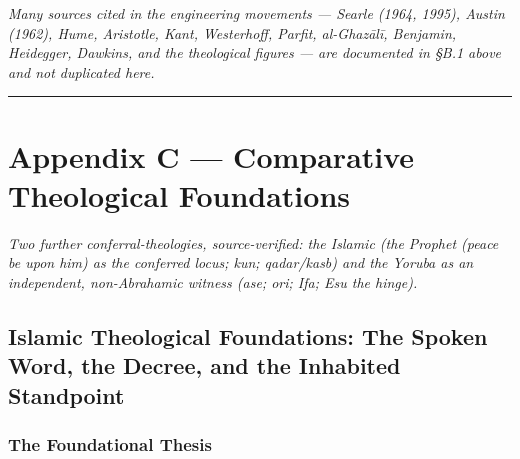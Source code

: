 \documentclass[11pt]{article}
\begin{document}
\emph{Many sources cited in the engineering movements — Searle (1964, 1995), Austin (1962), Hume, Aristotle, Kant, Westerhoff, Parfit, al-Ghazālī, Benjamin, Heidegger, Dawkins, and the theological figures — are documented in §B.1 above and not duplicated here.}

\medskip\noindent\rule{\linewidth}{0.3pt}\medskip

\section*{Appendix C — Comparative Theological Foundations}

\emph{Two further conferral-theologies, source-verified: the Islamic (the Prophet (peace be upon him) as the conferred locus; kun; qadar/\allowbreak{}kasb) and the Yoruba as an independent, non-Abrahamic witness (ase; ori; Ifa; Esu the hinge).}

\subsection*{Islamic Theological Foundations: The Spoken Word, the Decree, and the Inhabited Standpoint}

\subsubsection*{The Foundational Thesis}
\end{document}
